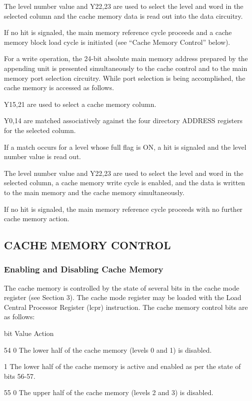 The level number value and Y22,23 are used to select the level and word in the
selected column and the cache memory data is read out into the data circuitry.

If no hit is signaled, the main memory reference cycle proceeds and a cache
memory block load cycle is initiated (see {``}Cache Memory Control'' below).

For a write operation, the 24-bit absolute main memory address prepared by the
appending unit is presented simultaneously to the cache control and to the main
memory port selection circuitry. While port selection is being accomplished,
the cache memory is accessed as follows.  

Y15,21 are used to select a cache memory column.  

Y0,14 are matched associatively against the four directory ADDRESS registers
for the selected column.

If a match occurs for a level whose full flag is ON, a hit is signaled and the
level number value is read out.  

The level number value and Y22,23 are used to select the level and word in the
selected column, a cache memory write cycle is enabled, and the data is written
to the main memory and the cache memory simultaneously.

If no hit is signaled, the main memory reference cycle proceeds with no further
cache memory action.  

\subsection{CACHE MEMORY CONTROL}

\subsubsection{Enabling and Disabling Cache Memory}

The cache memory is controlled by the state of several bits in the cache mode
register (see Section 3). The cache mode register may be loaded with the Load
Central Processor Register (lcpr) instruction. The cache memory control bits
are as follows:

bit Value Action


54 0 The lower half of the cache memory (levels 0 and 1) is disabled.

1 The lower half of the cache memory is active and enabled as per the state of
bits 56-57.

55 0 The upper half of the cache memory (levels 2 and 3) is disabled.

